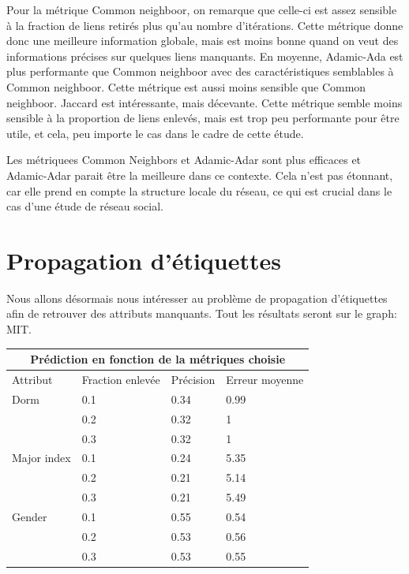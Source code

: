 \documentclass{article}
\begin{document}
Pour la métrique Common neighboor, on remarque que celle-ci est assez sensible à la fraction de liens retirés plus qu'au nombre d'itérations. Cette métrique donne donc une meilleure information globale, mais est moins bonne quand on veut des informations précises sur quelques liens manquants.
En moyenne, Adamic-Ada est plus performante que Common neighboor avec des caractéristiques semblables à Common neighboor. Cette métrique est aussi moins sensible que Common neighboor.
Jaccard est intéressante, mais décevante. Cette métrique semble moins sensible à la proportion de liens enlevés, mais est trop peu performante pour être utile, et cela, peu importe le cas dans le cadre de cette étude.

Les métriquees Common Neighbors et Adamic-Adar sont plus efficaces et Adamic-Adar parait être la meilleure dans ce contexte. Cela n'est pas étonnant, car elle prend en compte la structure locale du réseau, ce qui est crucial dans le cas d'une étude de réseau social.


\section{Propagation d'étiquettes}

Nous allons désormais nous intéresser au problème de propagation d'étiquettes afin de retrouver des attributs manquants.
Tout les résultats seront sur le graph: MIT.

\begin{tabular}{ |p{2.5cm}||p{4cm}|p{2cm}|p{3cm}|  }
    \hline
    \multicolumn{4}{|c|}{Prédiction en fonction de la métriques choisie} \\
    \hline
    Attribut & Fraction enlevée & Précision & Erreur moyenne \\
    \hline
    Dorm             & 0.1 & 0.34 & 0.99 \\
                     & 0.2 & 0.32 & 1 \\
                     & 0.3 & 0.32 & 1 \\
    \hhline{|=|=|=|=|}
    Major index      & 0.1 & 0.24 & 5.35 \\
                     & 0.2 & 0.21 & 5.14 \\
                     & 0.3 & 0.21 & 5.49 \\
    \hhline{|=|=|=|=|}
    Gender           & 0.1 & 0.55 & 0.54 \\
                     & 0.2 & 0.53 & 0.56 \\
                     & 0.3 & 0.53 & 0.55 \\
    \hline
\end{tabular}
\end{document}
